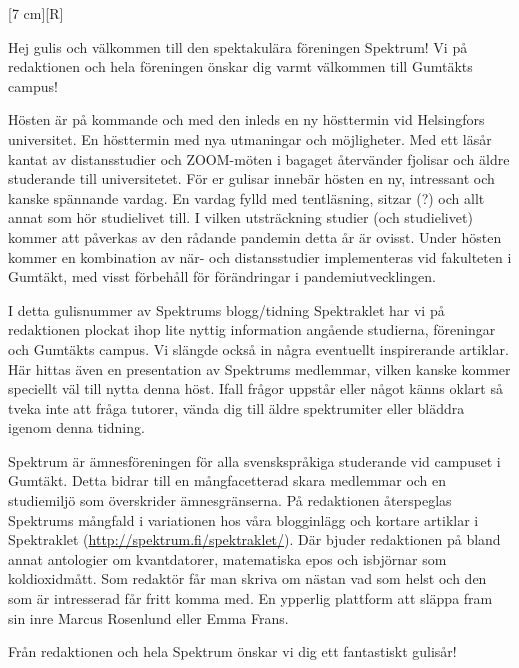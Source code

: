 \documentclass{spektraklet}
\begin{document}
\begin{ledaren}{}

[7 cm][R]


Hej gulis och välkommen till den spektakulära föreningen Spektrum! Vi på redaktionen och hela föreningen önskar dig varmt välkommen till Gumtäkts campus!

Hösten är på kommande och med den inleds en ny hösttermin vid Helsingfors universitet. En hösttermin med nya utmaningar och möjligheter. Med ett läsår kantat av distansstudier och ZOOM-möten i bagaget återvänder fjolisar och äldre studerande till universitetet. För er gulisar innebär hösten en ny, intressant och kanske spännande vardag. En vardag fylld med tentläsning, sitzar (?) och allt annat som hör studielivet till. I vilken utsträckning studier (och studielivet) kommer att påverkas av den rådande pandemin detta år är ovisst. Under hösten kommer en kombination av när- och distansstudier implementeras vid fakulteten i Gumtäkt, med visst förbehåll för förändringar i pandemiutvecklingen. 

I detta gulisnummer av Spektrums blogg/tidning Spektraklet har vi på redaktionen plockat ihop lite nyttig information angående studierna, föreningar och Gumtäkts campus. Vi slängde också in några eventuellt inspirerande artiklar. Här hittas även en presentation av Spektrums medlemmar, vilken kanske kommer speciellt väl till nytta denna höst. Ifall frågor uppstår eller något känns oklart så tveka inte att fråga tutorer, vända dig till äldre spektrumiter eller bläddra igenom denna tidning.

Spektrum är ämnesföreningen för alla svenskspråkiga studerande vid campuset i Gumtäkt. Detta bidrar till en mångfacetterad skara medlemmar och en studiemiljö som överskrider ämnesgränserna. På redaktionen återspeglas Spektrums mångfald i variationen hos våra blogginlägg och kortare artiklar i Spektraklet (\url{http://spektrum.fi/spektraklet/}). Där bjuder redaktionen på bland annat antologier om kvantdatorer, matematiska epos och isbjörnar som koldioxidmått. Som redaktör får man skriva om nästan vad som helst och den som är intresserad får fritt komma med. En ypperlig plattform att släppa fram sin inre Marcus Rosenlund eller Emma Frans.

Från redaktionen och hela Spektrum önskar vi dig ett fantastiskt gulisår!
\end{ledaren}
\end{document}
